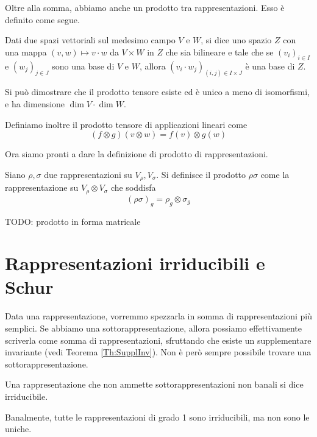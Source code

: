 \documentclass[a4paper,10pt,oneside]{math_article}
\begin{document}
    Oltre alla somma, abbiamo anche un prodotto tra rappresentazioni. Esso è definito come segue. 
    
    \begin{mydef}
     Dati due spazi vettoriali sul medesimo campo $V$ e $W$, si dice  uno spazio $Z$ con una mappa $(v,w) \mapsto v\cdot w$ da $V\times W$ in $Z$ che sia bilineare e tale che se $(v_i)_{i\in I}$ e $(w_j)_{j\in J}$ sono una base di $V$ e $W$, allora $(v_i\cdot w_j)_{(i,j)\in I\times J}$ è una base di $Z$.
    \end{mydef}
    
    Si può dimostrare che il prodotto tensore esiste ed è unico a meno di isomorfismi, e ha dimensione $\dim V \cdot \dim W$.
     
    Definiamo inoltre il prodotto tensore di applicazioni lineari come 
    \[
     (f \otimes g)(v\otimes w)=f(v)\otimes g(w) 
    \]
    
    Ora siamo pronti a dare la definizione di prodotto di rappresentazioni.

    \begin{mydef}
      Siano $\rho,\sigma$ due rappresentazioni su $V_\rho,V_\sigma$. Si definisce il prodotto $\rho\sigma$ come la rappresentazione su $V_\rho \otimes V_\sigma$ che soddisfa
      \[
       (\rho\sigma)_g = \rho_g \otimes \sigma_g
      \]

     
    \end{mydef}

    TODO: prodotto in forma matricale
  
  \section{Rappresentazioni irriducibili e Schur}
    Data una rappresentazione, vorremmo spezzarla in somma di rappresentazioni più semplici. Se abbiamo una sottorappresentazione, allora possiamo effettivamente scriverla come somma di rappresentazioni, sfruttando che esiste un supplementare invariante (vedi Teorema \ref{Th:SupplInv}). Non è però sempre possibile trovare una sottorappresentazione.
    \begin{mydef}
      Una rappresentazione che non ammette sottorappresentazioni non banali si dice irriducibile.
    \end{mydef}
    
    Banalmente, tutte le rappresentazioni di grado 1 sono irriducibili, ma non sono le uniche.
    
\end{document}
